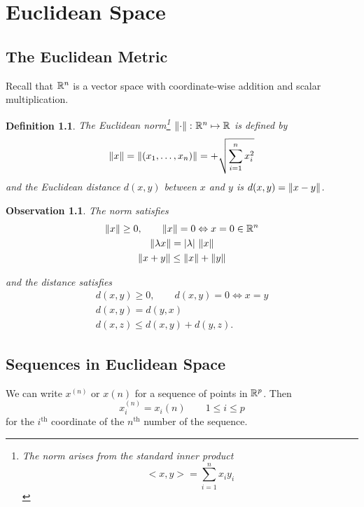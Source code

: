 \documentclass{notes}
\theoremstyle{plain}
\newtheorem{observation}[proposition]{Observation}
\newtheorem{definition}[proposition]{Definition}
\begin{document}

\chapter{Euclidean Space}
\section{The Euclidean Metric}

Recall that $ \mathbb{R}^{n} $ is a vector space with coordinate-wise 
addition and scalar multiplication.

\begin{definition}
The \emph{Euclidean norm}\footnote{The norm arises from the standard
inner product
\[ <x,y> = \sum_{i=1}^{n}x_{i}y_{i} \]} $ \left\| \cdot \right\|\colon \mathbb{R}^{n}\mapsto \mathbb{R}   $ is 
defined by
\[
\left\|x\right\| = \left\|(x_{1},\ldots,x_{n})\right\| = + 
\sqrt{\sum_{i=1}^{n}x_{i}^{2}}
\]
and the \emph{Euclidean distance} $ d(x,y) $ between $ x $ and $ y 
$ is $d(x,y) = \left\|x-y\right\|$.
\end{definition}

\begin{observation}
The norm satisfies
\begin{gather*}
\left\|x\right\| \geq 0, \qquad \left\|x\right\|=0 \Leftrightarrow x = 0 \in \mathbb{R}^{n} \\
\left\|\lambda x\right\| = \left|\lambda\right| \, \left\|x\right\| \\
\left\|x+y\right\| \leq \left\|x\right\| + \left\|y\right\|\\
\end{gather*}

and the distance satisfies
\begin{gather*}
d(x,y) \geq 0, \qquad d(x,y)=0 \Leftrightarrow x=y \\
d(x,y) = d(y,x) \\
d(x,z) \leq d(x,y)+d(y,z).
\end{gather*}
\end{observation}

\section{Sequences in Euclidean Space}
We can write $ x^{(n)} $ or $ x(n) $ for a sequence of points in 
$ \mathbb{R}^{p} $. Then \[ x_{i}^{(n)}=x_{i}(n) \qquad 1 \leq i \leq p \]
for the $ i^{\text{th}}$ coordinate of the $ n^{\text{th}}$ number of
the sequence.
\end{document}
